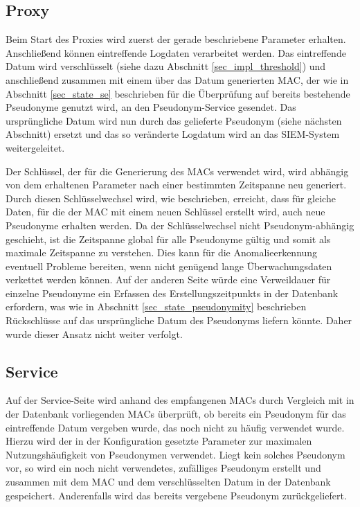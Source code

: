 \subsection{Proxy}

Beim Start des Proxies wird zuerst der gerade beschriebene Parameter erhalten. Anschließend können eintreffende Logdaten verarbeitet werden. Das eintreffende Datum wird verschlüsselt (siehe dazu Abschnitt \ref{sec_impl_threshold}) und anschließend zusammen mit einem über das Datum generierten MAC, der wie in Abschnitt \ref{sec_state_se} beschrieben für die Überprüfung auf bereits bestehende Pseudonyme genutzt wird, an den Pseudonym-Service gesendet. Das ursprüngliche Datum wird nun durch das gelieferte Pseudonym (siehe nächsten Abschnitt) ersetzt und das so veränderte Logdatum wird an das SIEM-System weitergeleitet.

Der Schlüssel, der für die Generierung des MACs verwendet wird, wird abhängig von dem erhaltenen Parameter nach einer bestimmten Zeitspanne neu generiert. Durch diesen Schlüsselwechsel wird, wie beschrieben, erreicht, dass für gleiche Daten, für die der MAC mit einem neuen Schlüssel erstellt wird, auch neue Pseudonyme erhalten werden. 
Da der Schlüsselwechsel nicht Pseudonym-abhängig geschieht, ist die Zeitspanne global für alle Pseudonyme gültig und somit als maximale Zeitspanne zu verstehen. Dies kann für die Anomalieerkennung eventuell Probleme bereiten, wenn nicht genügend lange Überwachungsdaten verkettet werden können. Auf der anderen Seite würde eine Verweildauer für einzelne Pseudonyme ein Erfassen des Erstellungszeitpunkts in der Datenbank erfordern, was wie in Abschnitt \ref{sec_state_pseudonymity} beschrieben Rückschlüsse auf das ursprüngliche Datum des Pseudonyms liefern könnte. Daher wurde dieser Ansatz nicht weiter verfolgt.

\subsection{Service}

Auf der Service-Seite wird anhand des empfangenen MACs durch Vergleich mit in der Datenbank vorliegenden MACs überprüft, ob bereits ein Pseudonym für das eintreffende Datum vergeben wurde, das noch nicht zu häufig verwendet wurde. Hierzu wird der in der Konfiguration gesetzte Parameter zur maximalen Nutzungshäufigkeit von Pseudonymen verwendet. Liegt kein solches Pseudonym vor, so wird ein noch nicht verwendetes, zufälliges Pseudonym erstellt und zusammen mit dem MAC und dem verschlüsselten Datum in der Datenbank gespeichert. Anderenfalls wird das bereits vergebene Pseudonym zurückgeliefert. 

